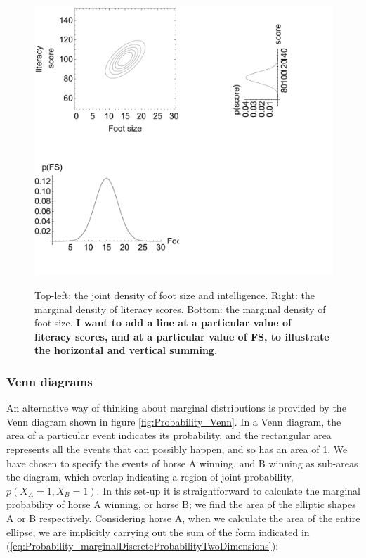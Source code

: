 \documentclass[11pt,fullpage]{book}
\begin{document}
\begin{figure}
\centering
\scalebox{0.5} 
{\includegraphics{Probability_footSizeIntelligenceMarginal.pdf}}
\caption{Top-left: the joint density of foot size and intelligence. Right: the marginal density of literacy scores. Bottom: the marginal density of foot size. \textbf{I want to add a line at a particular value of literacy scores, and at a particular value of FS, to illustrate the horizontal and vertical summing.}}\label{fig:Probability_footSizeIntelligenceMarginal}
\end{figure}

\subsubsection{Venn diagrams}
An alternative way of thinking about marginal distributions is provided by the Venn diagram shown in figure \ref{fig:Probability_Venn}. In a Venn diagram, the area of a particular event indicates its probability, and the rectangular area represents all the events that can possibly happen, and so has an area of 1. We have chosen to specify the events of horse A winning, and B winning as sub-areas the diagram, which overlap indicating a region of joint probability, $p(X_A=1,X_B=1)$. In this set-up it is straightforward to calculate the marginal probability of horse A winning, or horse B; we find the area of the elliptic shapes A or B respectively. Considering horse A, when we calculate the area of the entire ellipse, we are implicitly carrying out the sum of the form indicated in (\ref{eq:Probability_marginalDiscreteProbabilityTwoDimensions}):
\end{document}
